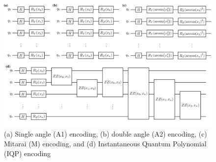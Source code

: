 \documentclass[journal=jacsat,manuscript=article]{achemso}
\begin{document}



  
\begin{figure}[H]
	\centering
	\includegraphics[width=\textwidth]{../images/encoders/quantikz/combined.png}
	\caption{(a) Single angle (A1) encoding, (b) double angle (A2) encoding, (c) Mitarai (M) encoding, and (d) Instantaneous Quantum Polynomial (IQP) encoding}
	\label{fig:encoders}
\end{figure}
\end{document}
